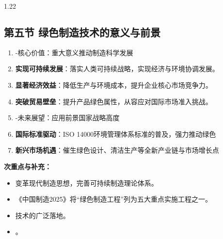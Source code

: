 \documentclass[12pt,a4paper]{article}
\begin{document}
\begin{spacing}{1.22}
\subsection{第五节 绿色制造技术的意义与前景}
\begin{tcolorbox}[colback=yellow!6,colframe=red!55!black,title=重点,left=1mm,right=1mm]
\begin{enumerate}[leftmargin=2.2em,label=\arabic*.]
  \item -核心价值：重大意义推动制造科学发展
  \item \textbf{实现可持续发展}：落实人类可持续战略，实现经济与环境协调发展。
  \item \textbf{显著经济效益}：降低生产与环境成本，提升企业核心市场竞争力。
  \item \textbf{突破贸易壁垒}：提升产品绿色属性，从容应对国际市场准入挑战。
  \item -未来展望：应用前景国家战略高度
  \item \textbf{国际标准驱动}：ISO 14000环境管理体系标准的普及，强力推动绿色
  \item \textbf{新兴市场机遇}：催生绿色设计、清洁生产等全新产业链与市场增长点
\end{enumerate}
\end{tcolorbox}
\noindent\textbf{次重点与补充：}
\begin{itemize}[leftmargin=2.2em,label=--]
  \item 变革现代制造思想，完善可持续制造理论体系。
  \item 《中国制造2025》将“绿色制造工程”列为五大重点实施工程之一。
  \item 技术的广泛落地。
  \item 。
\end{itemize}

\end{spacing}
\end{document}
